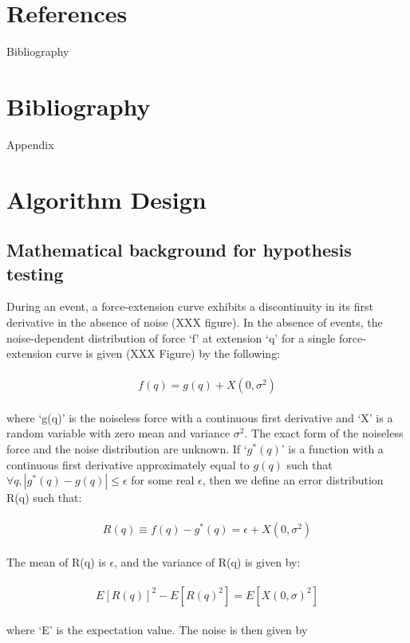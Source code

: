 \documentclass[%
  aip,12pt,tightenlines,
  amsthm,
 amsmath,amssymb
]{article}
\newcommand{\eqs}[1]{
\begin{align*} 
\begin{split}
#1
\end{split}					
\end{align*}}
\newcommand{\firstp}[0]{}
\newcommand{\pl}[0]{\vspace{6pt}}
\begin{document}


\section{References}



\clearpage

Bibliography 

\section{Bibliography}

 


\clearpage

Appendix

\section{Algorithm Design}


\subsection{Mathematical background for hypothesis testing}

\firstp During an event, a force-extension curve exhibits a discontinuity in its first derivative in the absence of noise (XXX figure). In the absence of events, the noise-dependent distribution of force `f' at extension `q' for a single force-extension curve is given (XXX Figure) by the following:

\eqs{ f(q) = g(q) + X(0,\sigma^2) }

where `g(q)' is the noiseless force with a continuous first derivative and `X' is a random variable with zero mean and variance $\sigma^2$. The exact form of the noiseless force and the noise distribution are unknown. If `$g^{*}(q)$' is a function with a continuous first derivative approximately equal to $g(q)$ such that $\forall q, |g^{*}(q)-g(q)| \le \epsilon$ for some real $\epsilon$, then we define an error distribution R(q) such that: \pl

\eqs{ R(q) \equiv f(q) - g^{*}(q) = 
  \epsilon + X(0,\sigma^2)  }

The mean of R(q) is $\epsilon$, and the variance of R(q) is given by:

\eqs{ E[R(q)]^2 - E[R(q)^2] = E[X(0,\sigma)^2] }

where `E' is the expectation value. The noise is then given by
\end{document}
